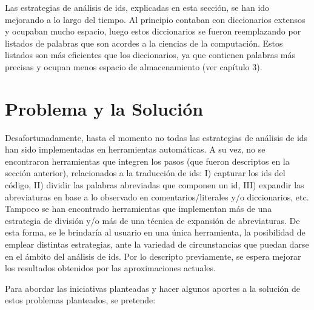 Las estrategias de análisis de ids, explicadas en esta sección, se han ido mejorando a lo largo del tiempo. Al principio contaban con diccionarios extensos y ocupaban mucho espacio, luego estos diccionarios se fueron reemplazando por listados de palabras que son acordes a la ciencias de la computación. Estos listados son más eficientes que los diccionarios, ya que contienen palabras más precisas y ocupan menos espacio de almacenamiento (ver capítulo 3).

\section{Problema y la Solución}

Desafortunadamente, hasta el momento no todas las estrategias de análisis de ids han sido implementadas en herramientas automáticas. A su vez, no se encontraron herramientas que integren los pasos (que fueron descriptos en la sección anterior), relacionados a la traducción de ids: 
I) capturar los ids del código, II) dividir las palabras abreviadas que componen un id, III) expandir las abreviaturas en base a lo observado en comentarios/literales y/o diccionarios, etc.
Tampoco se han encontrado herramientas que implementan más de una estrategia de división y/o más de una técnica de expansión de abreviaturas. De esta forma, se le brindaría al usuario en una única herramienta, la posibilidad de emplear distintas estrategias, ante la variedad de circunstancias que puedan darse en el ámbito del análisis de ids. Por lo descripto previamente, se espera mejorar los resultados obtenidos por las aproximaciones actuales.

Para abordar las iniciativas planteadas y hacer algunos aportes a la solución de estos problemas planteados, se pretende:

